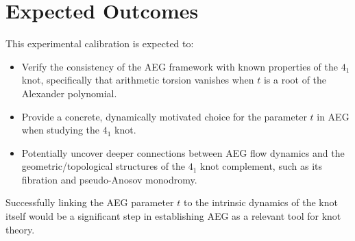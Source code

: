 \documentclass{article}
\begin{document}
\section{Expected Outcomes}
This experimental calibration is expected to:
\begin{itemize}
    \item Verify the consistency of the AEG framework with known properties of the $4_1$ knot, specifically that arithmetic torsion vanishes when $t$ is a root of the Alexander polynomial.
    \item Provide a concrete, dynamically motivated choice for the parameter $t$ in AEG when studying the $4_1$ knot.
    \item Potentially uncover deeper connections between AEG flow dynamics and the geometric/topological structures of the $4_1$ knot complement, such as its fibration and pseudo-Anosov monodromy.
\end{itemize}

Successfully linking the AEG parameter $t$ to the intrinsic dynamics of the knot itself would be a significant step in establishing AEG as a relevant tool for knot theory.
\end{document}
